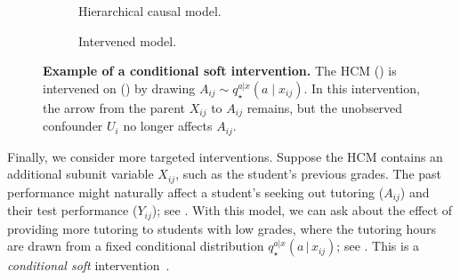 \documentclass[12pt]{article}
\newcommand{\g}{\,\vert\,}
\begin{document}
\begin{figure}
\centering
	\begin{subfigure}[c]{0.3\textwidth}
\caption{Hierarchical causal model.} \label{fig:hcm_obs_confound}
\centering
{}
\end{subfigure}
\begin{subfigure}[c]{0.3\textwidth}
\caption{Intervened model.} \label{fig:hcm_obs_confound_intervene}
\centering
{}
\end{subfigure}
\caption{\textbf{Example of a conditional soft intervention.} The HCM () is intervened on () by drawing $A_{ij} \sim q_\star^{a|x}(a \mid x_{ij})$. In this intervention, the arrow from the parent $X_{ij}$ to $A_{ij}$ remains, but the unobserved confounder $U_i$ no longer affects $A_{ij}$.}
\end{figure}

 
Finally, we consider more targeted interventions. Suppose the HCM contains an additional subunit variable $X_{ij}$, such as the student's previous grades. The past performance might naturally affect a student's seeking out tutoring ($A_{ij}$) and their test performance ($Y_{ij}$); see . With this model, we can ask about the effect of providing more tutoring to students with low grades, where the tutoring hours are drawn from a fixed conditional distribution $q_\star^{a|x}(a \g x_{ij})$; see .
This is a \textit{conditional soft} intervention~\citep[Chap. 4][]{Pearl2009-fh,Dawid2002-yq,Didelez2006-sf,Correa2020-df}.
\end{document}
